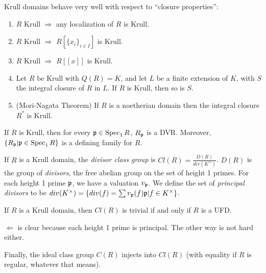  Krull domains behave very well with respect to ``closure properties'':
 \begin{enumerate}
   \item $R$ Krull $\Longrightarrow$ any localization of $R$ is Krull.
   \item $R$ Krull $\Longrightarrow$ $R[\{x_i\}_{i\in I}]$ is Krull.
   \item $R$ Krull $\Longrightarrow$ $R[[x]]$ is Krull.
   \item Let $R$ be Krull with $Q(R)=K$, and let $L$ be a finite extension of $K$, with
   $S$ the integral closure of $R$ in $L$. If $R$ is Krull, then so is $S$.
   \item (Mori-Nagata Theorem) If $R$ is a noetherian domain then the integral closure
   $R^*$ is Krull.
 \end{enumerate}
 \begin{theorem}
   If $R$ is Krull, then for every $\mathfrak{p}\in \operatorname{Spec}_1 R$, $R_{\mathfrak{p}}$ is a DVR. Moreover,
   $\{R_{\mathfrak{p}}|\mathfrak{p}\in \operatorname{Spec}_1 R\}$ is a defining family for $R$.
 \end{theorem}
 \begin{definition}
   If $R$ is a Krull domain, the \emph{divisor class group} is $Cl(R) =
   \frac{D(R)}{div(K^\times)}$. $D(R)$ is the group of \emph{divisors}, the free abelian
   group on the set of height 1 primes. For each height 1 prime $\mathfrak{p}$, we have a valuation
   $v_{\mathfrak{p}}$. We define the set of \emph{principal divisors} to be $div(K^\times) = \{div(f)
   = \sum v_{\mathfrak{p}}(f) \mathfrak{p}| f\in K^\times\}$.
 \end{definition}
 \begin{theorem}
   If $R$ is a Krull domain, then $Cl(R)$ is trivial if and only if $R$ is a UFD.
 \end{theorem}
 $\Leftarrow$ is clear because each height 1 prime is principal. The other way is not
 hard either.

 Finally, the ideal class group $C(R)$ injects into $Cl(R)$ (with equality if $R$ is
 regular, whatever that means).


